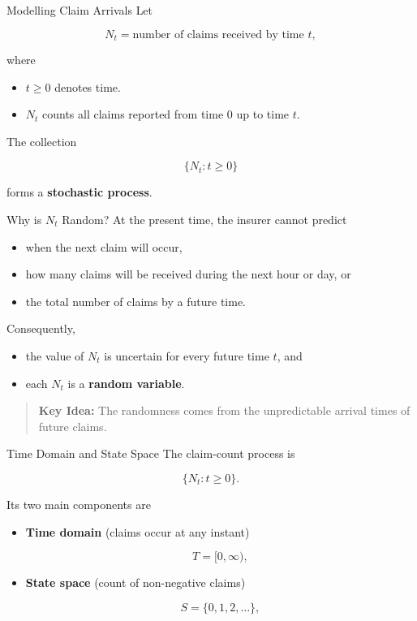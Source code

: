 \documentclass[
  ignorenonframetext,
  aspectratio=169,
]{beamer}
\providecommand{\tightlist}{%
  \setlength{\itemsep}{0pt}\setlength{\parskip}{0pt}}
\begin{document}
\begin{frame}{Modelling Claim Arrivals}
\protect{}\label{modelling-claim-arrivals}
Let

\[
N_t=\text{number of claims received by time }t,
\]

where

\begin{itemize}
\tightlist
\item
  \(t\ge0\) denotes time.
\item
  \(N_t\) counts all claims reported from time \(0\) up to time \(t\).
\end{itemize}

The collection

\[
\{N_t:t\ge0\}
\]

forms a \textbf{stochastic process}.
\end{frame}

\begin{frame}{Why is \(N_t\) Random?}
\protect{}\label{why-is-n_t-random}
At the present time, the insurer cannot predict

\begin{itemize}
\tightlist
\item
  when the next claim will occur,
\item
  how many claims will be received during the next hour or day, or
\item
  the total number of claims by a future time.
\end{itemize}

Consequently,

\begin{itemize}
\tightlist
\item
  the value of \(N_t\) is uncertain for every future time \(t\), and
\item
  each \(N_t\) is a \textbf{random variable}.
\end{itemize}

\begin{quote}
\textbf{Key Idea:} The randomness comes from the unpredictable arrival
times of future claims.
\end{quote}
\end{frame}

\begin{frame}{Time Domain and State Space}
\protect{}\label{time-domain-and-state-space-1}
The claim-count process is

\[
\{N_t:t\ge0\}.
\]

Its two main components are

\begin{itemize}
\item
  \textbf{Time domain} (claims occur at any instant)

  \[
  T=[0,\infty),
  \]
\item
  \textbf{State space} (count of non-negative claims)

  \[
  S=\{0,1,2,\ldots\},
  \]
\end{itemize}
\end{frame}
\end{document}
